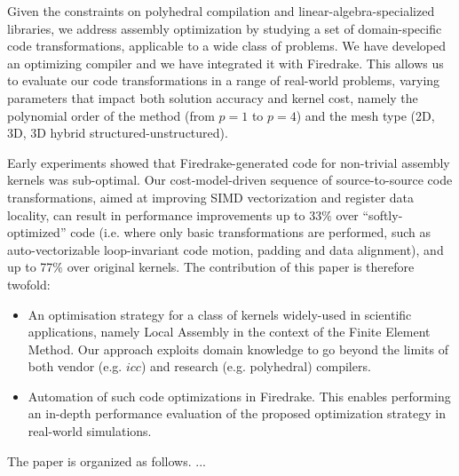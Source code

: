 \documentclass[conference]{IEEEtran}
\begin{document}
Given the constraints on polyhedral compilation and linear-algebra-specialized libraries, we address assembly optimization by studying a set of domain-specific code transformations, applicable to a wide class of problems. We have developed an optimizing compiler and we have integrated it with Firedrake. This allows us to evaluate our code transformations in a range of real-world problems, varying parameters that impact both solution accuracy and kernel cost, namely the polynomial order of the method (from $p=1$ to $p=4$) and the mesh type (2D, 3D, 3D hybrid structured-unstructured). 

Early experiments showed that Firedrake-generated code for non-trivial assembly kernels was sub-optimal. Our cost-model-driven sequence of source-to-source code transformations, aimed at improving SIMD vectorization and register data locality, can result in performance improvements up to 33$\%$ over ``softly-optimized'' code (i.e. where only basic transformations are performed, such as auto-vectorizable loop-invariant code motion, padding and data alignment), and up to 77$\%$ over original kernels. The contribution of this paper is therefore twofold:
\begin{itemize}
\item An optimisation strategy for a class of kernels widely-used in scientific applications, namely Local Assembly in the context of the Finite Element Method. Our approach exploits domain knowledge to go beyond the limits of both vendor (e.g. $icc$) and research (e.g. polyhedral) compilers.
\item Automation of such code optimizations in Firedrake. This enables performing an in-depth performance evaluation of the proposed optimization strategy in real-world simulations.
\end{itemize}

The paper is organized as follows. ...


\end{document}
